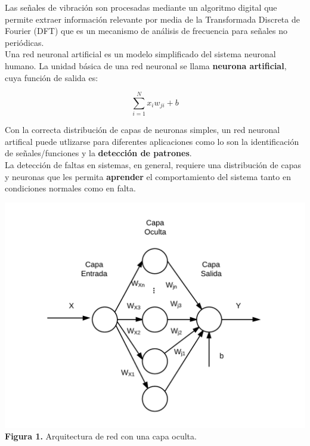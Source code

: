 \documentclass[a0paper,portrait]{baposter}
\begin{document}
\begin{poster}
{\begin{footnotesize}
Las señales de vibración son procesadas mediante un algoritmo digital que permite extraer información relevante por media de la Transformada Discreta de Fourier (DFT) que es un mecanismo de análisis de frecuencia para señales no periódicas. \\


Una red neuronal artificial es un modelo simplificado del sistema neuronal humano. La unidad básica de una red neuronal se llama \textbf{neurona artificial}, cuya función de salida es:
\end{footnotesize}

\begin{equation}
\sum_{i=1}^{N} x_i w_{ji} + b
\end{equation}


\begin{footnotesize}
Con la correcta distribución de capas de neuronas simples, un red neuronal artifical puede utlizarse para diferentes aplicaciones como lo son la identificación de señales/funciones y la \textbf{detección de patrones}. \\

La detección de faltas en sistemas, en general, requiere una distribución de capas y neuronas que les permita \textbf{aprender} el comportamiento del sistema tanto en condiciones normales como en falta. 
\end{footnotesize}
\begin{center}
\includegraphics[width=\linewidth]{ann}
\\ {\footnotesize \textbf{Figura 1.} Arquitectura de red con una capa oculta.}
\end{center}

}
\end{poster}
\end{document}
